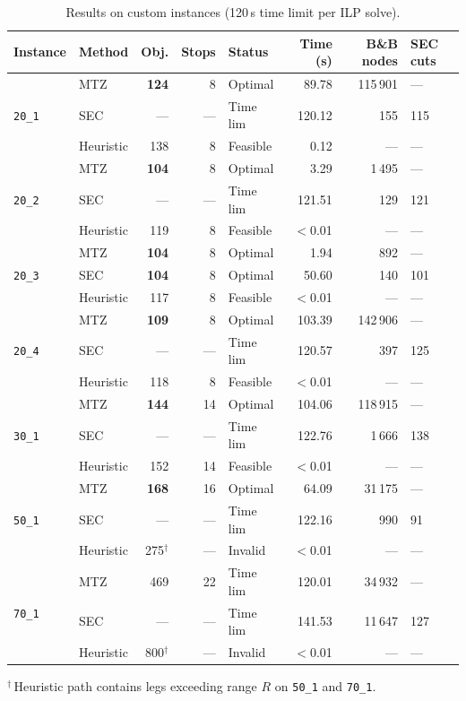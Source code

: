 \documentclass[12pt, a4paper]{article}
\begin{document}
\begin{table}[H]
\centering
\caption{Results on custom instances (120\,s time limit per ILP solve).}
\label{tab:custom_results}
\begin{tabular}{llrrlrrl}
\toprule
Instance & Method & Obj. & Stops & Status & Time (s) & B\&B nodes & SEC cuts \\
\midrule
\multirow{3}{*}{\texttt{20\_1}}
  & MTZ       & \textbf{124} & 8 & Optimal   &  89.78 & 115\,901 & --- \\
  & SEC       & ---          & --- & Time lim &120.12  &      155 & 115 \\
  & Heuristic & 138          & 8 & Feasible  &   0.12 & ---      & --- \\
\midrule
\multirow{3}{*}{\texttt{20\_2}}
  & MTZ       & \textbf{104} & 8 & Optimal   &   3.29 &   1\,495 & --- \\
  & SEC       & ---          & --- & Time lim &121.51  &      129 & 121 \\
  & Heuristic & 119          & 8 & Feasible  &  $<$0.01 & ---    & --- \\
\midrule
\multirow{3}{*}{\texttt{20\_3}}
  & MTZ       & \textbf{104} & 8  & Optimal  &   1.94 &      892 & --- \\
  & SEC       & \textbf{104} & 8  & Optimal  &  50.60 &      140 & 101 \\
  & Heuristic & 117          & 8  & Feasible &  $<$0.01 & ---    & --- \\
\midrule
\multirow{3}{*}{\texttt{20\_4}}
  & MTZ       & \textbf{109} & 8 & Optimal   & 103.39 & 142\,906 & --- \\
  & SEC       & ---          & --- & Time lim &120.57  &      397 & 125 \\
  & Heuristic & 118          & 8 & Feasible  &  $<$0.01 & ---    & --- \\
\midrule
\multirow{3}{*}{\texttt{30\_1}}
  & MTZ       & \textbf{144} & 14 & Optimal  & 104.06 & 118\,915 & --- \\
  & SEC       & ---          & --- & Time lim &122.76  &    1\,666 & 138 \\
  & Heuristic & 152          & 14 & Feasible &  $<$0.01 & ---    & --- \\
\midrule
\multirow{3}{*}{\texttt{50\_1}}
  & MTZ       & \textbf{168} & 16 & Optimal  &  64.09 &  31\,175 & --- \\
  & SEC       & ---          & --- & Time lim &122.16  &      990 & 91 \\
  & Heuristic & 275$^\dagger$ & --- & Invalid &  $<$0.01 & ---    & --- \\
\midrule
\multirow{3}{*}{\texttt{70\_1}}
  & MTZ       & 469 & 22 & Time lim  & 120.01 &  34\,932 & --- \\
  & SEC       & --- & --- & Time lim & 141.53 &  11\,647 & 127 \\
  & Heuristic & 800$^\dagger$ & --- & Invalid &  $<$0.01 & ---    & --- \\
\bottomrule
\end{tabular}
\end{table}
{\small $^\dagger$\,Heuristic path contains legs exceeding range $R$ on \texttt{50\_1} and \texttt{70\_1}.}
\end{document}
